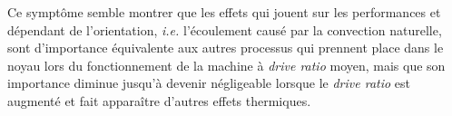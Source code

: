 

Ce symptôme semble montrer que les effets qui jouent sur les performances et dépendant de l'orientation, \textit{i.e.} l'écoulement causé par la convection naturelle, sont d'importance équivalente aux autres processus qui prennent place dans le noyau lors du fonctionnement de la machine à \textit{drive ratio} moyen, mais que son importance diminue jusqu'à devenir négligeable lorsque le \textit{drive ratio} est augmenté et fait apparaître d'autres effets thermiques.\medskip


